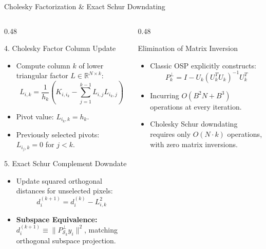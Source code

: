 \documentclass[aspectratio=169, 10pt]{beamer}
\begin{document}
\begin{frame}{Cholesky Factorization \& Exact Schur Downdating}
  \begin{columns}[T]
    \begin{column}{0.48\textwidth}
      \begin{block}{4. Cholesky Factor Column Update}
        \footnotesize
        \begin{itemize}\setlength{\itemsep}{1pt}
          \item Compute column $k$ of lower triangular factor $L \in \mathbb{R}^{N \times k}$:
          $$L_{i, k} = \frac{1}{h_k} \left( K_{i, i_k} - \sum_{j=1}^{k-1} L_{i, j} L_{i_k, j} \right)$$
          \item Pivot value: $L_{i_k, k} = h_k$.
          \item Previously selected pivots: $L_{i_j, k} = 0$ for $j < k$.
        \end{itemize}
      \end{block}

      \begin{block}{5. Exact Schur Complement Downdate}
        \footnotesize
        \begin{itemize}\setlength{\itemsep}{1pt}
          \item Update squared orthogonal distances for unselected pixels:
          $$d_i^{(k+1)} = d_i^{(k)} - L_{i, k}^2$$
          \item \textbf{Subspace Equivalence:} $d_i^{(k+1)} \equiv \|P_{\mathcal{S}_k}^\perp y_i\|^2$, matching orthogonal subspace projection.
        \end{itemize}
      \end{block}
    \end{column}

    \begin{column}{0.48\textwidth}
      \begin{block}{Elimination of Matrix Inversion}
        \footnotesize
        \begin{itemize}\setlength{\itemsep}{1pt}
          \item Classic OSP explicitly constructs:
          $$P_k^\perp = I - U_k (U_k^T U_k)^{-1} U_k^T$$
          \item Incurring $O(B^2 N + B^3)$ operations at every iteration.
          \item Cholesky Schur downdating requires only $O(N \cdot k)$ operations, with zero matrix inversions.
        \end{itemize}
      \end{block}


\end{column}
\end{columns}
\end{frame}
\end{document}
